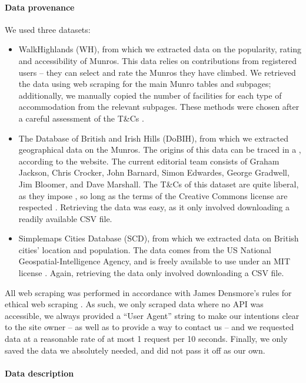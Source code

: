 \documentclass[11pt,a4paper]{article}
\begin{document}
\paragraph{Data provenance}
We used three datasets:
\begin{itemize}
    \item WalkHighlands (WH), from which we extracted data on the popularity, rating and accessibility of Munros. This data relies on contributions from registered users – they can select and rate the Munros they have climbed. We retrieved the data using web scraping for the main Munro tables and subpages; additionally, we manually copied the number of facilities for each type of accommodation from the relevant subpages. These methods were chosen after a careful assessment of the T\&Cs \cite{WHTC}.
    \item The Database of British and Irish Hills (DoBIH), from which we extracted geographical data on the Munros. The origins of this data can be traced in a , according to the website. The current editorial team consists of Graham Jackson, Chris Crocker, John Barnard, Simon Edwardes, George Gradwell, Jim Bloomer, and Dave Marshall. The T\&Cs of this dataset are quite liberal, as they impose , so long as the terms of the Creative Commons license are respected \cite{DoBIHTC}. Retrieving the data was easy, as it only involved downloading a readily available CSV file.
    \item Simplemaps Cities Database (SCD), from which we extracted data on British cities' location and population. The data comes from the US National Geospatial-Intelligence Agency, and is freely available to use under an MIT license \cite {SCDBT}. Again, retrieving the data only involved downloading a CSV file.
\end{itemize}

All web scraping was performed in accordance with James Densmore's rules for ethical web scraping \cite{EiWS}. As such, we only scraped data where no API was accessible, we always provided a “User Agent” string to make our intentions clear to the site owner – as well as to provide a way to contact us – and we requested data at a reasonable rate of at most 1 request per 10 seconds. Finally, we only saved the data we absolutely needed, and did not pass it off as our own.

\paragraph{Data description} 
\end{document}
